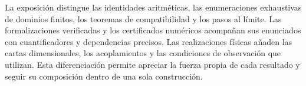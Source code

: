 La exposición distingue las identidades aritméticas, las
enumeraciones exhaustivas de dominios finitos, los teoremas de
compatibilidad y los pasos al límite. Las formalizaciones
verificadas y los certificados numéricos acompañan sus enunciados
con cuantificadores y dependencias precisos. Las realizaciones
físicas añaden las cartas dimensionales, los acoplamientos y las
condiciones de observación que utilizan. Esta diferenciación
permite apreciar la fuerza propia de cada resultado y seguir
su composición dentro de una sola construcción.
